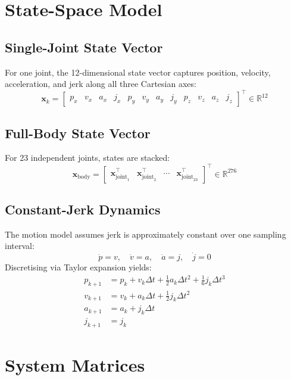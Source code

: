 \documentclass[12pt,a4paper]{article}
\begin{document}
\section{State-Space Model}

\subsection{Single-Joint State Vector}
For one joint, the 12-dimensional state vector captures position, velocity,
acceleration, and jerk along all three Cartesian axes:
\[
    \mathbf{x}_k = \begin{bmatrix}
        p_x & v_x & a_x & j_x &
        p_y & v_y & a_y & j_y &
        p_z & v_z & a_z & j_z
    \end{bmatrix}^\top \in \mathbb{R}^{12}
\]

\subsection{Full-Body State Vector}
For 23 independent joints, states are stacked:
\[
    \mathbf{x}_{\text{body}} = \begin{bmatrix}
        \mathbf{x}_{\text{joint}_1}^\top &
        \mathbf{x}_{\text{joint}_2}^\top &
        \cdots &
        \mathbf{x}_{\text{joint}_{23}}^\top
    \end{bmatrix}^\top \in \mathbb{R}^{276}
\]

\subsection{Constant-Jerk Dynamics}
The motion model assumes jerk is approximately constant over one sampling interval:
\[
    \dot{p} = v, \quad \dot{v} = a, \quad \dot{a} = j, \quad \dot{j} = 0
\]
Discretising via Taylor expansion yields:
\begin{align}
    p_{k+1} &= p_k + v_k\Delta t + \tfrac{1}{2}a_k\Delta t^2 + \tfrac{1}{6}j_k\Delta t^3 \\
    v_{k+1} &= v_k + a_k\Delta t + \tfrac{1}{2}j_k\Delta t^2 \\
    a_{k+1} &= a_k + j_k\Delta t \\
    j_{k+1} &= j_k
\end{align}

\section{System Matrices}
\end{document}
